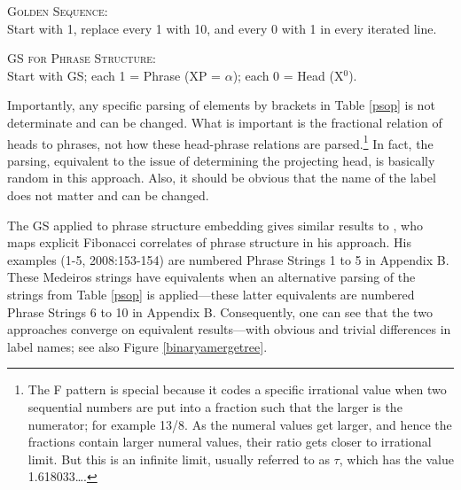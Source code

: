 \documentclass[11pt,twoside]{article}
\begin{document}
\begin{algorithm}\textsc{Golden Sequence:}\\
Start with 1, replace every 1 with 10, and every 0 with 1 in every iterated line.\label{gsalgo}  
\end{algorithm}

\begin{algorithm}\textsc{GS for Phrase Structure:}\\
Start with GS; each 1 = Phrase (XP = $\alpha$); each 0 = Head (X$^{0}$).\label{psalgo}
\end{algorithm}

Importantly, any specific parsing of elements by brackets in Table \ref{psop} is not determinate and can be changed. What is important is the fractional relation of heads to phrases, not how these head-phrase relations are parsed.\footnote{The F pattern is special because it codes a specific irrational value when two sequential numbers are put into a fraction such that the larger is the numerator; for example 13/8. As the numeral values get larger, and hence the fractions contain larger numeral values, their ratio gets closer to irrational limit. But this is an infinite limit, usually referred to as $\tau$, which has the value 1.618033\ldots.} In fact, the parsing, equivalent to the issue of determining the projecting head, is basically random in this approach. Also, it should be obvious that the name of the label does not matter and can be changed. 

The GS applied to phrase structure embedding gives similar results to \cite{medeiros:2008}, who maps explicit Fibonacci correlates of phrase structure in his approach. His examples (1-5, 2008:153-154) are numbered Phrase Strings 1 to 5 in Appendix B. These Medeiros strings have equivalents when an alternative parsing of the strings from Table \ref{psop} is applied---these latter equivalents are numbered Phrase Strings 6 to 10 in Appendix B. Consequently, one can see that the two approaches converge on equivalent results---with obvious and trivial differences in label names; see also Figure \ref{binaryamergetree}.
\end{document}
